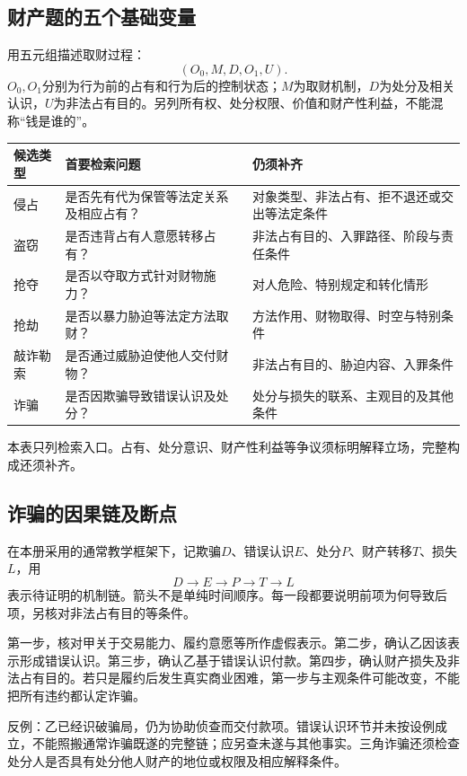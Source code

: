 \subsection{财产题的五个基础变量}
用五元组描述取财过程：
\[
 (O_0,M,D,O_1,U).
\]
$O_0,O_1$分别为行为前的占有和行为后的控制状态；$M$为取财机制，$D$为处分及相关认识，$U$为非法占有目的。另列所有权、处分权限、价值和财产性利益，不能混称“钱是谁的”。

\begin{center}
\begingroup\small
\begin{tabular}{p{}p{}p{}}
\toprule
候选类型 & 首要检索问题 & 仍须补齐\\\midrule
侵占 & 是否先有代为保管等法定关系及相应占有？ & 对象类型、非法占有、拒不退还或交出等法定条件\\
盗窃 & 是否违背占有人意愿转移占有？ & 非法占有目的、入罪路径、阶段与责任条件\\
抢夺 & 是否以夺取方式针对财物施力？ & 对人危险、特别规定和转化情形\\
抢劫 & 是否以暴力胁迫等法定方法取财？ & 方法作用、财物取得、时空与特别条件\\
敲诈勒索 & 是否通过威胁迫使他人交付财物？ & 非法占有目的、胁迫内容、入罪条件\\
诈骗 & 是否因欺骗导致错误认识及处分？ & 处分与损失的联系、主观目的及其他条件\\\bottomrule
\end{tabular}
\endgroup
\end{center}
本表只列检索入口。占有、处分意识、财产性利益等争议须标明解释立场，完整构成还须补齐。

\subsection{诈骗的因果链及断点}
在本册采用的通常教学框架下，记欺骗$D$、错误认识$E$、处分$P$、财产转移$T$、损失$L$，用
\[
 D\longrightarrow E\longrightarrow P\longrightarrow T\longrightarrow L
\]
表示待证明的机制链。箭头不是单纯时间顺序。每一段都要说明前项为何导致后项，另核对非法占有目的等条件。

第一步，核对甲关于交易能力、履约意愿等所作虚假表示。第二步，确认乙因该表示形成错误认识。第三步，确认乙基于错误认识付款。第四步，确认财产损失及非法占有目的。若只是履约后发生真实商业困难，第一步与主观条件可能改变，不能把所有违约都认定诈骗。

反例：乙已经识破骗局，仍为协助侦查而交付款项。错误认识环节并未按设例成立，不能照搬通常诈骗既遂的完整链；应另查未遂与其他事实。三角诈骗还须检查处分人是否具有处分他人财产的地位或权限及相应解释条件。

